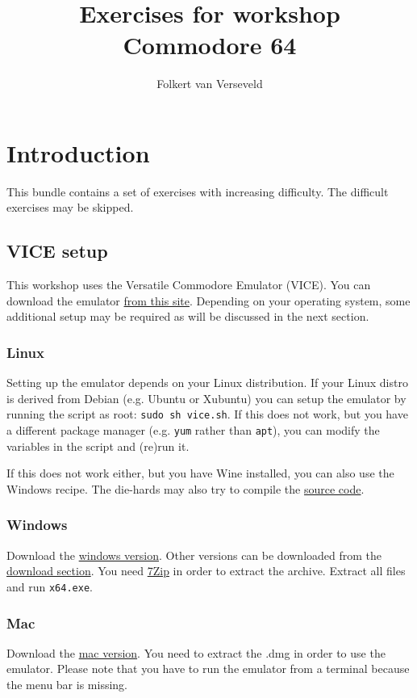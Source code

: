 \documentclass{article}
\title{Exercises for workshop Commodore 64}
\author{Folkert van Verseveld}
\begin{document}
\maketitle

\section{Introduction}

This bundle contains a set of exercises with increasing difficulty.
The difficult exercises may be skipped.

\subsection{VICE setup}
This workshop uses the Versatile Commodore Emulator (VICE).
You can download the emulator \href{http://vice-emu.sourceforge.net/}{from this site}.
Depending on your operating system, some additional setup may be required as will be discussed in the next section.

\subsubsection{Linux}
Setting up the emulator depends on your Linux distribution.
If your Linux distro is derived from Debian (e.g. Ubuntu or Xubuntu) you can setup the emulator by running the script as root:
\verb:sudo sh vice.sh:.
If this does not work, but you have a different package manager (e.g. \verb:yum: rather than \verb:apt:), you can modify the variables in the script and (re)run it.

If this does not work either, but you have Wine installed, you can also use the Windows recipe.
The die-hards may also try to compile the \href{http://sourceforge.net/projects/vice-emu/files/releases/vice-3.1.tar.gz/download}{source code}.

\subsubsection{Windows}
Download the \href{http://sourceforge.net/projects/vice-emu/files/releases/binaries/windows/WinVICE-3.1-x64.7z/download}{windows version}.
Other versions can be downloaded from the \href{http://vice-emu.sourceforge.net/windows.html}{download section}.
You need \href{http://www.7-zip.org/}{7Zip} in order to extract the archive.
Extract all files and run \verb:x64.exe:.

\subsubsection{Mac}
Download the \href{http://sourceforge.net/projects/vice-emu/files/releases/binaries/macosx/vice-macosx-sdl-x86_64-10.12-3.1.dmg/download}{mac version}.
You need to extract the .dmg in order to use the emulator.
Please note that you have to run the emulator from a terminal because the menu bar is missing.
\end{document}
